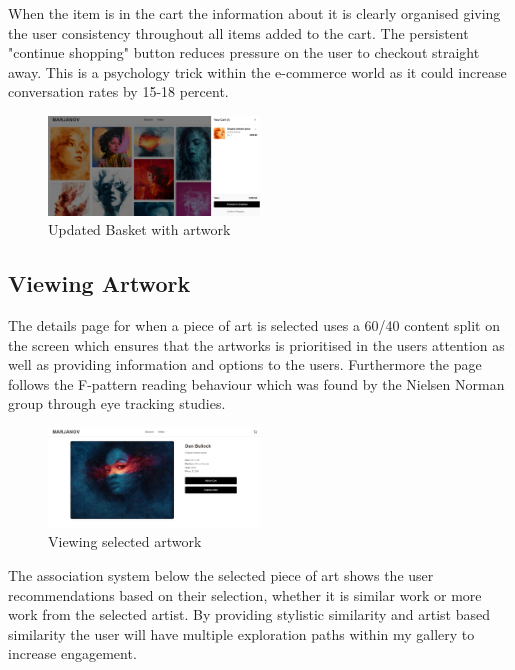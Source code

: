 \documentclass[]{project_final}
\begin{document}
When the item is in the cart the information about it is clearly organised giving the user consistency throughout all items added to the cart.
The persistent "continue shopping" button reduces pressure on the user to checkout straight away. This is a psychology trick within the e-commerce world as it could increase conversation rates by 15-18 percent.

\begin{figure}[ht!]
    \centering
    \includegraphics[width=0.5\textwidth]{AG5.png}
    \vspace*{0.0cm}
    \caption{Updated Basket with artwork}
    \label{fig:1}
\end{figure}

\subsection{Viewing Artwork}

The details page for when a piece of art is selected uses a 60/40 content split on the screen which ensures that the artworks is prioritised in the users attention as well as providing information and options to the users. Furthermore the page follows the F-pattern reading behaviour which was found by the Nielsen Norman group through eye tracking studies.

\begin{figure}[ht!]
    \centering
    \includegraphics[width=0.5\textwidth]{AG6.png}
    \vspace*{0.0cm}
    \caption{Viewing selected artwork}
    \label{fig:1}
\end{figure}

The association system below the selected piece of art shows the user recommendations based on their selection, whether it is similar work or more work from the selected artist. By providing stylistic similarity and artist based similarity the user will have multiple exploration paths within my gallery to increase engagement.
\end{document}
